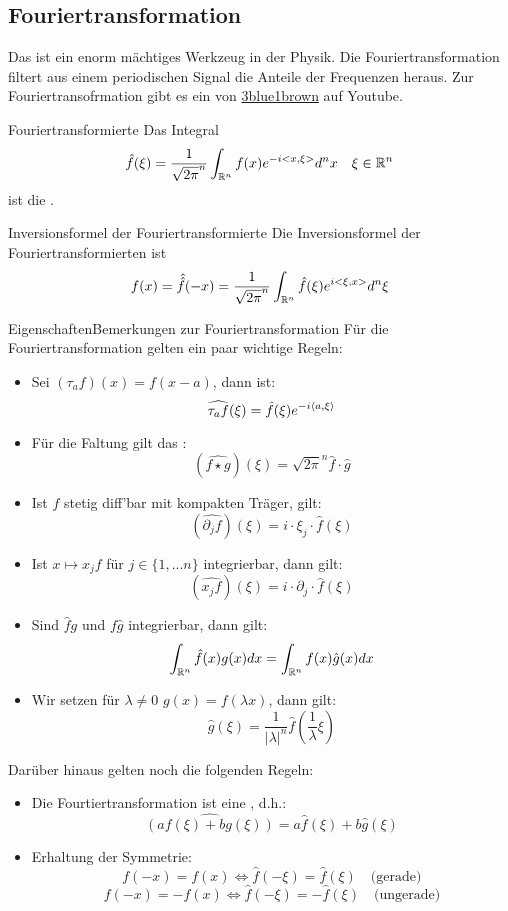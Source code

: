\subsection{Fouriertransformation}
Das ist ein enorm mächtiges Werkzeug in der Physik. Die Fouriertransformation filtert aus einem periodischen Signal die Anteile der Frequenzen heraus. Zur Fouriertransofrmation gibt es ein  von \href{https://github.com/luxdragon/MfP3-Notizen}{3blue1brown} auf Youtube.
\begin{Def}{Fouriertransformierte}
    Das Integral
    $$\hat{f}(\xi)=\frac{1}{\sqrt{2\pi}^n}\int_{\mathbb{R}^n}f(x)e^{-i<x,\xi>}d^nx \quad \xi \in \mathbb{R}^n$$
    ist die .
\end{Def}
\begin{Def}{Inversionsformel der Fouriertransformierte}
Die Inversionsformel der Fouriertransformierten ist
$$f(x)=\hat{\hat{f}}(-x)=\frac{1}{\sqrt{2\pi}^n}\int_{\mathbb{R}^n}\hat{f}(\xi)e^{i<\xi, x>}d^n\xi$$
\end{Def}
\begin{Satz}{Eigenschaften}{Bemerkungen zur Fouriertransformation}
    Für die Fouriertransformation gelten ein paar wichtige Regeln:
    \begin{itemize}
        \item Sei $(\tau_a f)(x)=f(x-a)$, dann ist:
        $$\widehat{\tau_a f}(\xi)=\hat{f}(\xi)e^{-i\braket{a,\xi}}$$
        \item Für die Faltung gilt das :
        $$(\widehat{f\star g})(\xi)=\sqrt{2\pi}^n \hat{f}\cdot \hat{g}$$
        \item Ist $f$ stetig diff'bar mit kompakten Träger, gilt:
        $$(\widehat{\partial_j f})(\xi) = i\cdot \xi_j \cdot \hat{f}(\xi)$$
        \item Ist $x\mapsto x_j f$ für $j\in \{1,...n \}$ integrierbar, dann gilt:
        $$(\widehat{x_j f})(\xi)=i\cdot \partial_j \cdot \hat{f}(\xi)$$
        \item Sind $\hat{f}g$ und $f\hat{g}$ integrierbar, dann gilt:
        $$\int_{\mathbb{R}^n}\hat{f}(x)g(x)dx = \int_{\mathbb{R}^n}f(x)\hat{g}(x)dx$$
        \item Wir setzen für $\lambda \neq 0$ $g(x)=f(\lambda x)$, dann gilt:
        $$\hat{g}(\xi)=\frac{1}{|\lambda|^n}\hat{f}(\frac{1}{\lambda}\xi)$$
    \end{itemize}
    Darüber hinaus gelten noch die folgenden Regeln:
    \begin{itemize}
        \item Die Fourtiertransformation ist eine , d.h.:
        $$\widehat{(af(\xi)+bg(\xi))}=a\hat{f}(\xi)+b\hat{g}(\xi)$$
        \item Erhaltung der Symmetrie:
        $$f(-x)=f(x) \iff \hat{f}(-\xi)=\hat{f}(\xi) \quad \mbox{(gerade)}$$
        $$f(-x)=-f(x) \iff \hat{f}(-\xi)=-\hat{f}(\xi) \quad \mbox{(ungerade)}$$
    \end{itemize}
\end{Satz}
